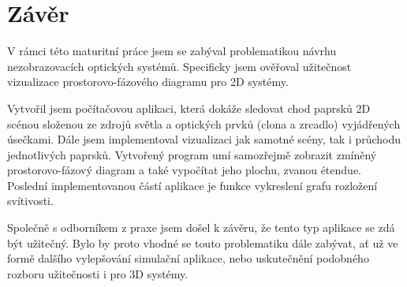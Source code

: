 \chapter{Závěr}

V rámci této maturitní práce jsem se zabýval problematikou návrhu nezobrazovacích optických systémů. Specificky jsem ověřoval užitečnost vizualizace prostorovo-fá\-zo\-vé\-ho diagramu pro 2D systémy.

Vytvořil jsem počítačovou aplikaci, která dokáže sledovat chod paprsků 2D scénou složenou ze zdrojů světla a optických prvků (clona a zrcadlo) vyjádřených úsečkami. Dále jsem implementoval vizualizaci jak samotné scény, tak i průchodu jednotlivých paprsků. Vytvořený program umí samozřejmě zobrazit zmíněný prostorovo-fázový diagram a také vypočítat jeho plochu, zvanou étendue. Poslední implementovanou částí aplikace je funkce vykreslení grafu rozložení svítivosti.

Společně s odborníkem z praxe jsem došel k závěru, že tento typ aplikace se zdá být užitečný. Bylo by proto vhodné se touto problematiku dále zabývat, ať už ve formě dalšího vylepšování simulační aplikace, nebo uskutečnění podobného rozboru užitečnosti i pro 3D systémy.
